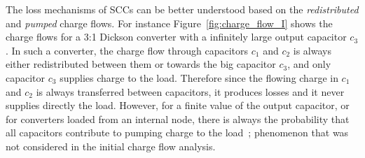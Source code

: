 The loss mechanisms of SCCs can be better understood based on the \emph{redistributed} and \emph{pumped} charge flows. For instance Figure~\ref{fig:charge_flow_I} shows the charge flows for a 3:1 Dickson converter with a infinitely large output capacitor $c_3$. In such a converter, the charge flow through capacitors $c_1$ and $c_2$ is always either redistributed between them or towards the big capacitor $c_3$, and only capacitor $c_3$ supplies charge to the load. Therefore since the flowing charge in $c_1$ and $c_2$ is always transferred between capacitors, it produces losses and it never supplies directly the load. However, for a finite value of the output capacitor, or for converters loaded from an internal node, there is always the probability that all capacitors contribute to pumping charge to the load~\cite{2013Breussegem:c_out}; phenomenon that was not considered in the initial charge flow analysis.
